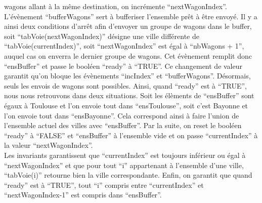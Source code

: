 wagons allant à la même destination, on incrémente ``nextWagonIndex''.
L'évènement ``bufferWagons'' sert à bufferiser l'ensemble prêt à être envoyé. Il y a
ainsi deux conditions d'arrêt afin d'envoyer un groupe de wagons dans le buffer,
soit ``tabVoie(nextWagonIndex)'' désigne une ville différente de
``tabVoie(currentIndex)'', soit ``nextWagonIndex'' est égal à ``nbWagons + 1'', auquel
cas on enverra le dernier groupe de wagons. Cet évènement remplit donc ``ensBuffer''
et passe le booléen ``ready'' à ``TRUE''. Ce changement de valeur garantit qu'on
bloque les évènements ``incIndex'' et ``bufferWagons''. Désormais, seuls les envois
de wagons sont possibles.
Ainsi, quand ``ready'' est à ``TRUE'', nous nous retrouvons dans deux situations.
Soit les élèments de ``ensBuffer'' sont égaux à Toulouse et l'on envoie tout dans
``ensToulouse'', soit c'est Bayonne et l'on envoie tout dans ``ensBayonne''. Cela
correspond ainsi à faire l'union de l'ensemble actuel des villes avec ``ensBuffer''.
Par la suite, on reset le booléen ``ready'' à ``FALSE'' et ``ensBuffer'' à l'ensemble
vide et on passe ``currentIndex'' à la valeur ``nextWagonIndex''.
\\
Les invariants garantissent que ``currentIndex'' est toujours inférieur ou égal à
``nextWagonIndex'' et que pour tout ``i'' appartenant à l'ensemble d'une ville,
``tabVoie(i)'' retourne bien la ville correspondante. Enfin, on garantit que quand
``ready'' est à ``TRUE'', tout ``i'' compris entre ``currentIndex'' et ``nextWagonIndex-1'' est compris dans ``ensBuffer''.
